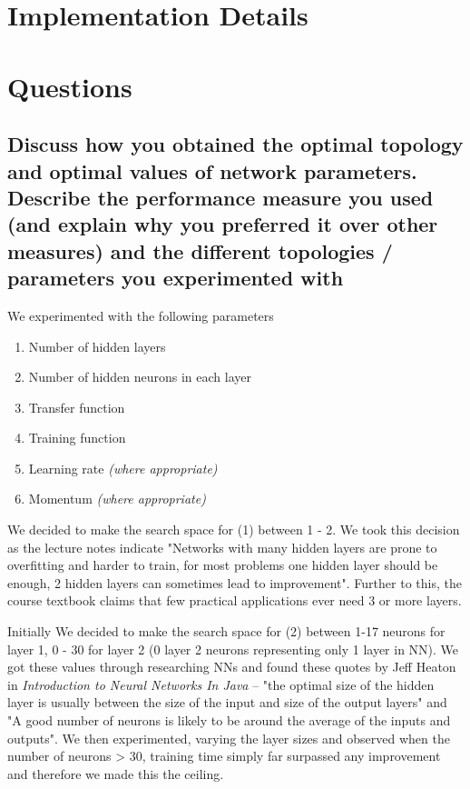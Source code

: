 \documentclass[11pt]{article}
\begin{document}
\section{Implementation Details}
\section{Questions}

\subsection{Discuss how you obtained the optimal topology and optimal values of network parameters. Describe the performance measure you used (and explain why you preferred it over other measures) and the different topologies / parameters you experimented with}



We experimented with the following parameters
\begin{enumerate}
  \item Number of hidden layers
  \item Number of hidden neurons in each layer
  \item Transfer function
  \item Training function
  \item Learning rate \emph{(where appropriate)}
  \item Momentum      \emph{(where appropriate)}
\end{enumerate}

We decided to make the search space for (1) between 1 - 2. We took this decision as the lecture notes indicate "Networks with many hidden layers are prone to overfitting and harder to train, for most problems one hidden layer should be enough, 2 hidden layers can sometimes lead to improvement". Further to this, the course textbook claims that few practical applications ever need 3 or more layers.

Initially We decided to make the search space for (2) between 1-17 neurons for layer 1, 0 - 30 for layer 2 (0 layer 2 neurons representing only 1 layer in NN). We got these values through researching NNs and found these quotes by Jeff Heaton in \emph{Introduction to Neural Networks In Java} -- "the optimal size of the hidden layer is usually between the size of the input and size of the output layers" and "A good number of neurons is likely to be around the average of the inputs and outputs". We then experimented, varying the layer sizes and observed when the number of neurons > 30, training time simply far surpassed any improvement and therefore we made this the ceiling.
\end{document}
